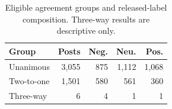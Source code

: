 \begin{table}[t]
\centering
\footnotesize
\caption{Eligible agreement groups and released-label composition. Three-way results are descriptive only.}
\label{tab:groups}
\begin{tabular}{lrrrr}
\toprule
Group & Posts & Neg. & Neu. & Pos. \\
\midrule
Unanimous & 3,055 & 875 & 1,112 & 1,068 \\
Two-to-one & 1,501 & 580 & 561 & 360 \\
Three-way & 6 & 4 & 1 & 1 \\
\bottomrule
\end{tabular}
\end{table}
